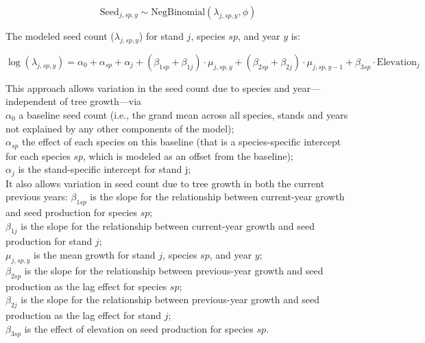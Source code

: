 \documentclass[11pt,letter]{article}
\begin{document}
\[
\text{Seed}_{j,sp,y} \sim \text{NegBinomial}(\lambda_{j,sp,y}, \phi)
\]

The modeled seed count (\(\lambda_{j,sp,y}\)) for stand \(j\), species \(sp\), and year \(y\) is:

\[
\log(\lambda_{j, sp, y}) =\alpha_{0} + \alpha_{sp} + \alpha_{j} + (\beta_{1 sp} + \beta_{1 j}) \cdot \mu_{j,sp,y} + (\beta_{2 sp} + \beta_{2 j}) \cdot \mu_{j,sp,y-1} + \beta_{3 sp} \cdot \text{Elevation}_{j}
\]


This approach allows variation in the seed count due to species and year---independent of tree growth---via \\
\(\alpha_{0}\) a baseline seed count (i.e., the grand mean across all species, stands and years not explained by any other components of the model);\\
\(\alpha_{sp}\) the effect of each species on this baseline (that is a species-specific intercept for each species $sp$, which is modeled as an offset from the baseline);\\ %
\(\alpha_{j}\) is the stand-specific intercept for stand j;\\
It also allows variation in seed count due to tree growth in both the current previous years: %
\(\beta_{1 sp}\) is the slope for the relationship between current-year growth and seed production for species \(sp\);\\
\(\beta_{1 j}\) is the slope for the relationship between current-year growth and seed production for stand \(j\);\\
\(\mu_{j,sp,y}\) is the mean growth for stand \(j\), species \(sp\), and year \(y\);\\
\(\beta_{2 sp}\) is the slope for the relationship between previous-year growth and seed production as the lag effect for species \(sp\);\\
\(\beta_{2 j}\) is the slope for the relationship between previous-year growth and seed production as the lag effect for stand \(j\);\\
\(\beta_{3 sp}\) is the effect of elevation on seed production for species \(sp\).\\ %
\end{document}
